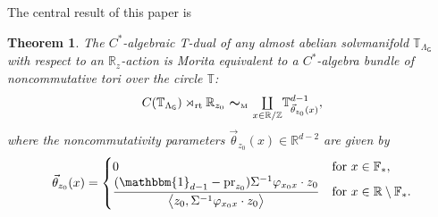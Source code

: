 \documentclass[pdftex]{sigma}
\numberwithin{equation}{section}
\newcommand{\Z}{\zed}
\newcommand{\F}{\mathbb{F}}
\newcommand{\mbf}[1]{{\boldsymbol {#1} }}
\newcommand{\unit}{\mathbbm{1}} 			%
\newcommand{\sfG}{\mathsf{G}}
\newcommand{\rt}{{\rm rt}}
\newcommand{\mcoprod}{\mbox{$\coprod\limits_{x\in\R/\Z}$}}
\newcommand{\R}{\real}
\newcommand{\zed}{{\mathbb Z}} %
\newcommand{\real}{{\mathbb R}} %
\newcommand{\torus}{{\mathbb T}} %
\newcommand{\proj}{{\rm pr}}
\newtheorem{Theorem}{Theorem}[section]
\begin{document}
The central result of this paper is
\begin{Theorem}
\label{thm:NCtorusbundlegen}
The $C^*$-algebraic T-dual of any almost abelian
solvmanifold $\torus_{\Lambda_\sfG}$ with respect to an $\R_z$-action
is Morita equivalent to a $C^*$-algebra bundle
of noncommutative tori over the circle $\torus$:
\begin{gather*}%
C(\torus_{\Lambda_\sfG})\rtimes_\rt\real_{ z_0}
 \ \mbf\sim_{\text{\tiny M}} \ \mcoprod
\torus^{d-1}_{\vec\theta_{z_0}(x)} ,
\end{gather*}
where the noncommutativity parameters $\vec\theta_{z_0}(x)\in\R^{d-2}$ are given
by
\begin{gather}\label{eq:thetaz0}
\vec\theta_{z_0}(x) = \begin{cases}
 0 & \mbox{for} \ x \in \F_* , \\
 \dfrac{(\unit_{d-1}-\proj_{ z_0}) \Sigma^{-1} \varphi_{x_0 x}\cdot
 z_0}{\big\langle{ z_0},\Sigma^{-1} \varphi_{x_0 x}\cdot z_0\big\rangle}
 & \mbox{for} \ x\in\R\setminus\F_* . \end{cases}
\end{gather}
\end{Theorem}
\end{document}
